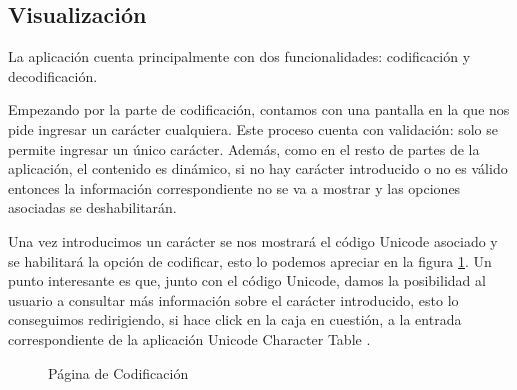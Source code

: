 \documentclass{article}
\begin{document}
\subsection{Visualización}
La aplicación cuenta principalmente con dos funcionalidades: codificación y
decodificación.

Empezando por la parte de codificación, contamos con una pantalla en la que nos
pide ingresar un carácter cualquiera. Este proceso cuenta con validación: solo
se permite ingresar un único carácter. Además, como en el resto de partes de la
aplicación, el contenido es dinámico, si no hay carácter introducido o no es
válido entonces la información correspondiente no se va a mostrar y las opciones
asociadas se deshabilitarán.

Una vez introducimos un carácter se nos mostrará el código Unicode asociado y se
habilitará la opción de codificar, esto lo podemos apreciar en la figura
\ref{fig:codificacion}. Un punto interesante es que, junto con el código
Unicode, damos la posibilidad al usuario a consultar más información sobre el
carácter introducido, esto lo conseguimos redirigiendo, si hace click en la caja
en cuestión, a la entrada correspondiente de la aplicación Unicode Character
Table \cite{unicode-table-source}.

\begin{figure}[h!]
  \centering
  \caption{Página de Codificación}
  \label{fig:codificacion}
\end{figure}
\end{document}
